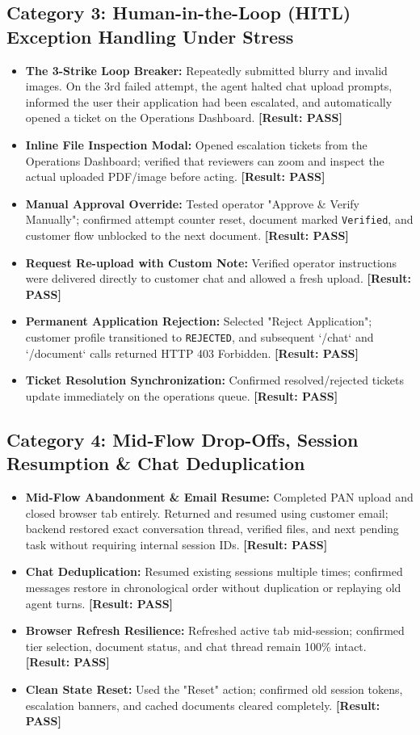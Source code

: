 \documentclass[12pt,a4paper]{article}
\begin{document}
\subsection{Category 3: Human-in-the-Loop (HITL) Exception Handling Under Stress}
\begin{itemize}
    \item \textbf{The 3-Strike Loop Breaker:} Repeatedly submitted blurry and invalid images. On the 3rd failed attempt, the agent halted chat upload prompts, informed the user their application had been escalated, and automatically opened a ticket on the Operations Dashboard. \textbf{[Result: PASS]}
    \item \textbf{Inline File Inspection Modal:} Opened escalation tickets from the Operations Dashboard; verified that reviewers can zoom and inspect the actual uploaded PDF/image before acting. \textbf{[Result: PASS]}
    \item \textbf{Manual Approval Override:} Tested operator "Approve \& Verify Manually"; confirmed attempt counter reset, document marked \texttt{Verified}, and customer flow unblocked to the next document. \textbf{[Result: PASS]}
    \item \textbf{Request Re-upload with Custom Note:} Verified operator instructions were delivered directly to customer chat and allowed a fresh upload. \textbf{[Result: PASS]}
    \item \textbf{Permanent Application Rejection:} Selected "Reject Application"; customer profile transitioned to \texttt{REJECTED}, and subsequent `/chat` and `/document` calls returned HTTP 403 Forbidden. \textbf{[Result: PASS]}
    \item \textbf{Ticket Resolution Synchronization:} Confirmed resolved/rejected tickets update immediately on the operations queue. \textbf{[Result: PASS]}
\end{itemize}

\subsection{Category 4: Mid-Flow Drop-Offs, Session Resumption \& Chat Deduplication}
\begin{itemize}
    \item \textbf{Mid-Flow Abandonment \& Email Resume:} Completed PAN upload and closed browser tab entirely. Returned and resumed using customer email; backend restored exact conversation thread, verified files, and next pending task without requiring internal session IDs. \textbf{[Result: PASS]}
    \item \textbf{Chat Deduplication:} Resumed existing sessions multiple times; confirmed messages restore in chronological order without duplication or replaying old agent turns. \textbf{[Result: PASS]}
    \item \textbf{Browser Refresh Resilience:} Refreshed active tab mid-session; confirmed tier selection, document status, and chat thread remain 100\% intact. \textbf{[Result: PASS]}
    \item \textbf{Clean State Reset:} Used the "Reset" action; confirmed old session tokens, escalation banners, and cached documents cleared completely. \textbf{[Result: PASS]}
\end{itemize}
\end{document}
